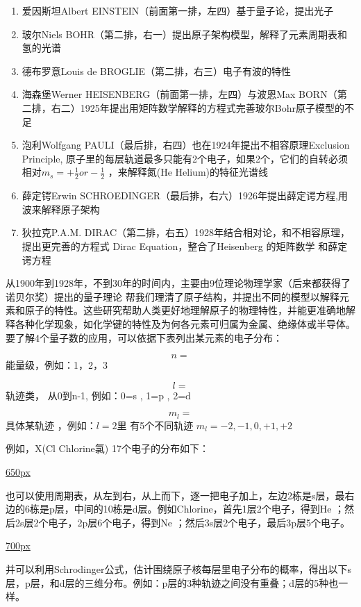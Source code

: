 \begin{enumerate}
\tightlist
\item
  爱因斯坦Albert EINSTEIN（前面第一排，左四）基于量子论，提出光子
\item
  玻尔Niels
  BOHR（第二排，右一）提出原子架构模型，解释了元素周期表和氢的光谱
\item
  德布罗意Louis de BROGLIE（第二排，右三）电子有波的特性
\item
  海森堡Werner HEISENBERG（前面第一排，左四）与波恩Max
  BORN（第二排，右二）1925年提出用矩阵数学解释的方程式完善玻尔Bohr原子模型的不足
\item
  泡利Wolfgang PAULI（最后排，右四）也在1924年提出不相容原理Exclusion
  Principle,
  原子里的每层轨道最多只能有2个电子，如果2个，它们的自转必须相对\(m_s = + \frac{1}{2} or - \frac{1}{2}\)
  ，来解释氮(He Helium)的特征光谱线
\item
  薛定锷Erwin
  SCHROEDINGER（最后排，右六）1926年提出薛定谔方程,用波来解释原子架构
\item
  狄拉克P.A.M.
  DIRAC（第二排，右五）1928年结合相对论，和不相容原理，提出更完善的方程式
  Dirac Equation，整合了Heisenberg 的矩阵数学 和薛定谔方程
\end{enumerate}

从1900年到1928年，不到30年的时间内，主要由9位理论物理学家（后来都获得了诺贝尔奖）提出的量子理论
帮我们理清了原子结构，并提出不同的模型以解释元素和原子的特性。这些研究帮助人类更好地理解原子的物理特性，并能更准确地解释各种化学现象，如化学键的特性及为何各元素可归属为金属、绝缘体或半导体。\\
要了解4个量子数的应用，可以依据下表列出某元素的电子分布：

\[n =\] 能量级，例如：1，2，3

\[l=\] 轨迹类， 从0到n-1, 例如：0=s , 1=p , 2=d

\[m_l=\] 具体某轨迹 ，例如：\(l=2\)里 有5个不同轨迹
\(m_l = -2, -1, 0, +1, +2\)

例如，X(Cl Chlorine氯) 17个电子的分布如下：

\href{文件:!chlorine_Screenshot_2024-12-29_100317.2.jpg}{650px}

也可以使用周期表，从左到右，从上而下，逐一把电子加上，左边2栋是s层，最右边的6栋是p层，中间的10栋是d层。例如Chlorine，首先1层2个电子，得到He
；然后2s层2个电子，2p层6个电子，得到Ne
；然后3s层2个电子，最后3p层5个电子。

\href{文件:!periodic_table_Screenshot_2024-12-29_100607.jpg}{700px}

并可以利用Schrodinger公式，估计围绕原子核每层里电子分布的概率，得出以下s层，p层，和d层的三维分布。例如：p层的3种轨迹之间没有重叠；d层的5种也一样。

